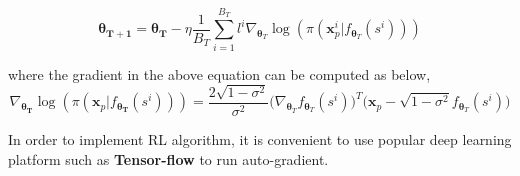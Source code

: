 \documentclass[12pt,a4paper]{article}
\begin{document}
	\begin{equation}
		\bm{\theta_{T+1}}=\bm{\theta_T}-\eta\frac{1}{B_T}\sum_{i=1}^{B_T}l^{i}\nabla_{\bm{\theta}_T}\log(\pi(\bm{x}_p^{i}\vert f_{\bm{\theta}_T}(s^{i})))
	\end{equation}
	\par where the gradient in the above equation can be computed as below,
	\begin{equation}
		\nabla_{\bm{\theta_T}}\log(\pi(\bm{x}_p\vert f_{\bm{\theta_T}}(s^i)))=\frac{2\sqrt{1-\sigma^2}}{\sigma^2}\big(\nabla_{\bm{\theta}_T}f_{\bm{\theta}_T}(s^i)\big)^T\big(\bm{x}_p-\sqrt{1-\sigma^2}f_{\bm{\theta}_T}(s^i)\big)
	\end{equation}
	\par In order to implement RL algorithm, it is convenient to use popular deep learning platform such as \textbf{Tensor-flow} to run auto-gradient.
\end{document}
